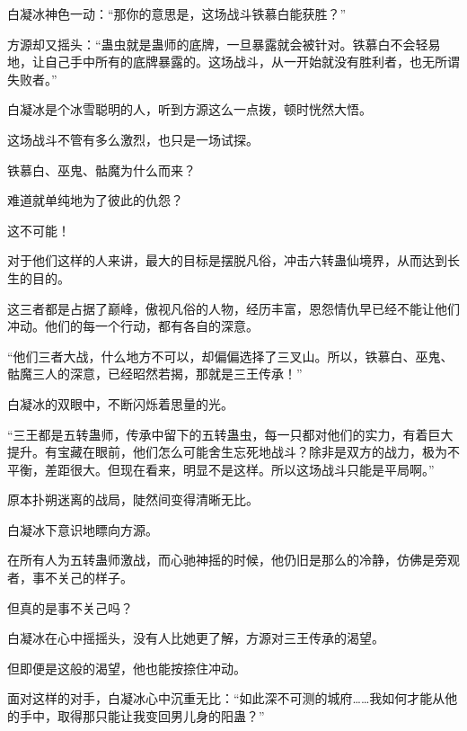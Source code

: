 \begin{this_body}
白凝冰神色一动：“那你的意思是，这场战斗铁慕白能获胜？”

方源却又摇头：“蛊虫就是蛊师的底牌，一旦暴露就会被针对。铁慕白不会轻易地，让自己手中所有的底牌暴露的。这场战斗，从一开始就没有胜利者，也无所谓失败者。”

白凝冰是个冰雪聪明的人，听到方源这么一点拨，顿时恍然大悟。

这场战斗不管有多么激烈，也只是一场试探。

铁慕白、巫鬼、骷魔为什么而来？

难道就单纯地为了彼此的仇怨？

这不可能！

对于他们这样的人来讲，最大的目标是摆脱凡俗，冲击六转蛊仙境界，从而达到长生的目的。

这三者都是占据了巅峰，傲视凡俗的人物，经历丰富，恩怨情仇早已经不能让他们冲动。他们的每一个行动，都有各自的深意。

“他们三者大战，什么地方不可以，却偏偏选择了三叉山。所以，铁慕白、巫鬼、骷魔三人的深意，已经昭然若揭，那就是三王传承！”

白凝冰的双眼中，不断闪烁着思量的光。

“三王都是五转蛊师，传承中留下的五转蛊虫，每一只都对他们的实力，有着巨大提升。有宝藏在眼前，他们怎么可能舍生忘死地战斗？除非是双方的战力，极为不平衡，差距很大。但现在看来，明显不是这样。所以这场战斗只能是平局啊。”

原本扑朔迷离的战局，陡然间变得清晰无比。

白凝冰下意识地瞟向方源。

在所有人为五转蛊师激战，而心驰神摇的时候，他仍旧是那么的冷静，仿佛是旁观者，事不关己的样子。

但真的是事不关己吗？

白凝冰在心中摇摇头，没有人比她更了解，方源对三王传承的渴望。

但即便是这般的渴望，他也能按捺住冲动。

面对这样的对手，白凝冰心中沉重无比：“如此深不可测的城府……我如何才能从他的手中，取得那只能让我变回男儿身的阳蛊？”

\end{this_body}

